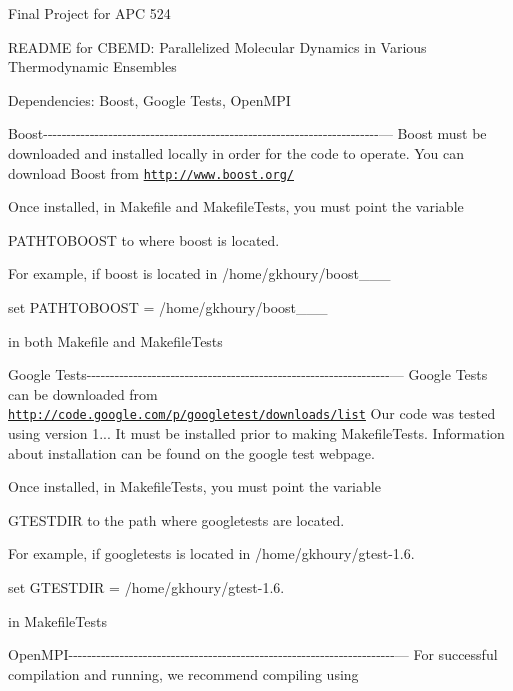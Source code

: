 Final Project for A\-P\-C 524

R\-E\-A\-D\-M\-E for C\-B\-E\-M\-D\-: Parallelized Molecular Dynamics in Various Thermodynamic Ensembles

Dependencies\-: Boost, Google Tests, Open\-M\-P\-I

Boost-\/-\/-\/-\/-\/-\/-\/-\/-\/-\/-\/-\/-\/-\/-\/-\/-\/-\/-\/-\/-\/-\/-\/-\/-\/-\/-\/-\/-\/-\/-\/-\/-\/-\/-\/-\/-\/-\/-\/-\/-\/-\/-\/-\/-\/-\/-\/-\/-\/-\/-\/-\/-\/-\/-\/-\/-\/-\/-\/-\/-\/-\/-\/-\/-\/-\/-\/-\/-\/-\/-\/-\/--- Boost must be downloaded and installed locally in order for the code to operate. You can download Boost from \href{http://www.boost.org/}{\tt http\-://www.\-boost.\-org/}

Once installed, in Makefile and Makefile\-Tests, you must point the variable

P\-A\-T\-H\-T\-O\-B\-O\-O\-S\-T to where boost is located.

For example, if boost is located in /home/gkhoury/boost\-\_\-\_\-\_

set P\-A\-T\-H\-T\-O\-B\-O\-O\-S\-T = /home/gkhoury/boost\-\_\-\_\-\_

in both Makefile and Makefile\-Tests

Google Tests-\/-\/-\/-\/-\/-\/-\/-\/-\/-\/-\/-\/-\/-\/-\/-\/-\/-\/-\/-\/-\/-\/-\/-\/-\/-\/-\/-\/-\/-\/-\/-\/-\/-\/-\/-\/-\/-\/-\/-\/-\/-\/-\/-\/-\/-\/-\/-\/-\/-\/-\/-\/-\/-\/-\/-\/-\/-\/-\/-\/-\/-\/-\/-\/-\/--- Google Tests can be downloaded from \href{http://code.google.com/p/googletest/downloads/list}{\tt http\-://code.\-google.\-com/p/googletest/downloads/list} Our code was tested using version 1... It must be installed prior to making Makefile\-Tests. Information about installation can be found on the google test webpage.

Once installed, in Makefile\-Tests, you must point the variable

G\-T\-E\-S\-T\-D\-I\-R to the path where googletests are located.

For example, if googletests is located in /home/gkhoury/gtest-\/1.6.

set G\-T\-E\-S\-T\-D\-I\-R = /home/gkhoury/gtest-\/1.6.

in Makefile\-Tests

Open\-M\-P\-I-\/-\/-\/-\/-\/-\/-\/-\/-\/-\/-\/-\/-\/-\/-\/-\/-\/-\/-\/-\/-\/-\/-\/-\/-\/-\/-\/-\/-\/-\/-\/-\/-\/-\/-\/-\/-\/-\/-\/-\/-\/-\/-\/-\/-\/-\/-\/-\/-\/-\/-\/-\/-\/-\/-\/-\/-\/-\/-\/-\/-\/-\/-\/-\/-\/-\/-\/-\/-\/-\/--- For successful compilation and running, we recommend compiling using

